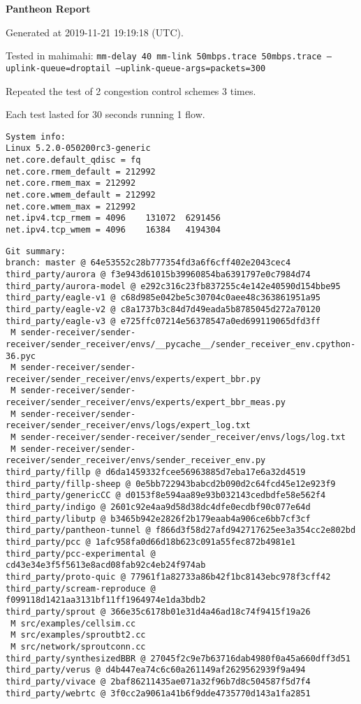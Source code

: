 \documentclass{article}
\begin{document}
\centerline{\textbf{\large{Pantheon Report}}}
\vspace{20pt}

Generated at 2019-11-21 19:19:18 (UTC).

Tested in mahimahi: \texttt{mm-delay 40 mm-link 50mbps.trace 50mbps.trace --uplink-queue=droptail --uplink-queue-args=packets=300}

Repeated the test of 2 congestion control schemes 3 times.

Each test lasted for 30 seconds running 1 flow.

\begin{verbatim}
System info:
Linux 5.2.0-050200rc3-generic
net.core.default_qdisc = fq
net.core.rmem_default = 212992
net.core.rmem_max = 212992
net.core.wmem_default = 212992
net.core.wmem_max = 212992
net.ipv4.tcp_rmem = 4096	131072	6291456
net.ipv4.tcp_wmem = 4096	16384	4194304
\end{verbatim}

\begin{verbatim}
Git summary:
branch: master @ 64e53552c28b777354fd3a6f6cff402e2043cec4
third_party/aurora @ f3e943d61015b39960854ba6391797e0c7984d74
third_party/aurora-model @ e292c316c23fb837255c4e142e40590d154bbe95
third_party/eagle-v1 @ c68d985e042be5c30704c0aee48c363861951a95
third_party/eagle-v2 @ c8a1737b3c84d7d49eada5b8785045d272a70120
third_party/eagle-v3 @ e725ffc07214e56378547a0ed699119065dfd3ff
 M sender-receiver/sender-receiver/sender_receiver/envs/__pycache__/sender_receiver_env.cpython-36.pyc
 M sender-receiver/sender-receiver/sender_receiver/envs/experts/expert_bbr.py
 M sender-receiver/sender-receiver/sender_receiver/envs/experts/expert_bbr_meas.py
 M sender-receiver/sender-receiver/sender_receiver/envs/logs/expert_log.txt
 M sender-receiver/sender-receiver/sender_receiver/envs/logs/log.txt
 M sender-receiver/sender-receiver/sender_receiver/envs/sender_receiver_env.py
third_party/fillp @ d6da1459332fcee56963885d7eba17e6a32d4519
third_party/fillp-sheep @ 0e5bb722943babcd2b090d2c64fcd45e12e923f9
third_party/genericCC @ d0153f8e594aa89e93b032143cedbdfe58e562f4
third_party/indigo @ 2601c92e4aa9d58d38dc4dfe0ecdbf90c077e64d
third_party/libutp @ b3465b942e2826f2b179eaab4a906ce6bb7cf3cf
third_party/pantheon-tunnel @ f866d3f58d27afd942717625ee3a354cc2e802bd
third_party/pcc @ 1afc958fa0d66d18b623c091a55fec872b4981e1
third_party/pcc-experimental @ cd43e34e3f5f5613e8acd08fab92c4eb24f974ab
third_party/proto-quic @ 77961f1a82733a86b42f1bc8143ebc978f3cff42
third_party/scream-reproduce @ f099118d1421aa3131bf11ff1964974e1da3bdb2
third_party/sprout @ 366e35c6178b01e31d4a46ad18c74f9415f19a26
 M src/examples/cellsim.cc
 M src/examples/sproutbt2.cc
 M src/network/sproutconn.cc
third_party/synthesizedBBR @ 27045f2c9e7b63716dab4980f0a45a660dff3d51
third_party/verus @ d4b447ea74c6c60a261149af2629562939f9a494
third_party/vivace @ 2baf86211435ae071a32f96b7d8c504587f5d7f4
third_party/webrtc @ 3f0cc2a9061a41b6f9dde4735770d143a1fa2851
\end{verbatim}
\end{document}
